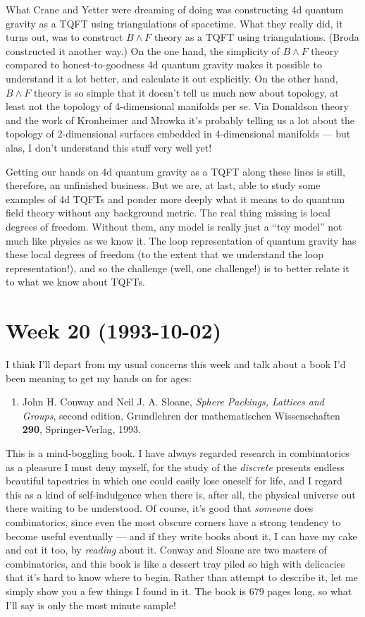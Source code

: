 \documentclass{article}
\def\tightlist{}
\begin{document}
What Crane and Yetter were dreaming of doing was constructing 4d quantum
gravity as a TQFT using triangulations of spacetime. What they really
did, it turns out, was to construct \(B\wedge F\) theory as a TQFT using
triangulations. (Broda constructed it another way.) On the one hand, the
simplicity of \(B\wedge F\) theory compared to honest-to-goodness 4d
quantum gravity makes it possible to understand it a lot better, and
calculate it out explicitly. On the other hand, \(B\wedge F\) theory is
so simple that it doesn't tell us much new about topology, at least not
the topology of 4-dimensional manifolds per se. Via Donaldson theory and
the work of Kronheimer and Mrowka it's probably telling us a lot about
the topology of 2-dimensional surfaces embedded in 4-dimensional
manifolds --- but alas, I don't understand this stuff very well yet!

Getting our hands on 4d quantum gravity as a TQFT along these lines is
still, therefore, an unfinished business. But we are, at last, able to
study some examples of 4d TQFTs and ponder more deeply what it means to
do quantum field theory without any background metric. The real thing
missing is local degrees of freedom. Without them, any model is really
just a ``toy model'' not much like physics as we know it. The loop
representation of quantum gravity has these local degrees of freedom (to
the extent that we understand the loop representation!), and so the
challenge (well, one challenge!) is to better relate it to what we know
about TQFTs.
\hypertarget{week20}{%
\section{Week 20 (1993-10-02)}\label{week20}}

I think I'll depart from my usual concerns this week and talk about a
book I'd been meaning to get my hands on for ages:

\begin{enumerate}
\def\labelenumi{\arabic{enumi})}
\tightlist
\item
  John H. Conway and Neil J. A. Sloane, \emph{Sphere Packings, Lattices
  and Groups}, second edition, Grundlehren der mathematischen
  Wissenschaften \textbf{290}, Springer-Verlag, 1993.
\end{enumerate}

This is a mind-boggling book. I have always regarded research in
combinatorics as a pleasure I must deny myself, for the study of the
\emph{discrete} presents endless beautiful tapestries in which one could
easily lose oneself for life, and I regard this as a kind of
self-indulgence when there is, after all, the physical universe out
there waiting to be understood. Of course, it's good that \emph{someone}
does combinatorics, since even the most obscure corners have a strong
tendency to become useful eventually --- and if they write books about
it, I can have my cake and eat it too, by \emph{reading} about it.
Conway and Sloane are two masters of combinatorics, and this book is
like a dessert tray piled so high with delicacies that it's hard to know
where to begin. Rather than attempt to describe it, let me simply show
you a few things I found in it. The book is 679 pages long, so what I'll
say is only the most minute sample!
\end{document}
